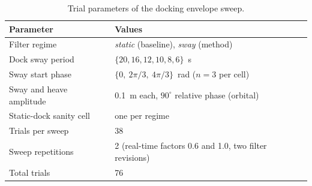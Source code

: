 \begin{table}[H]
    \centering
    \caption{Trial parameters of the docking envelope sweep.}
    \label{tab:sweep-params}
    \begin{tabular}{l l}
        \hline
        Parameter                & Values                                                  \\
        \hline
        Filter regime            & \emph{static} (baseline), \emph{sway} (method)          \\
        Dock sway period         & $\{20, 16, 12, 10, 8, 6\}$~s                            \\
        Sway start phase         & $\{0,\ 2\pi/3,\ 4\pi/3\}$~rad ($n{=}3$ per cell)        \\
        Sway and heave amplitude & 0.1~m each, $90^\circ$ relative phase (orbital)         \\
        Static-dock sanity cell  & one per regime                                          \\
        Trials per sweep         & 38                                                      \\
        Sweep repetitions        & 2 (real-time factors 0.6 and 1.0, two filter revisions) \\
        Total trials             & 76                                                      \\
        \hline
    \end{tabular}
\end{table}


